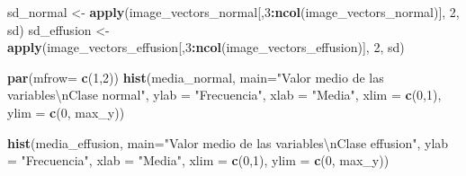 \documentclass[]{article}
\newenvironment{Shaded}{\begin{snugshade}}{\end{snugshade}}
\newcommand{\KeywordTok}[1]{\textcolor[rgb]{0.13,0.29,0.53}{\textbf{#1}}}
\newcommand{\DataTypeTok}[1]{\textcolor[rgb]{0.13,0.29,0.53}{#1}}
\newcommand{\DecValTok}[1]{\textcolor[rgb]{0.00,0.00,0.81}{#1}}
\newcommand{\CharTok}[1]{\textcolor[rgb]{0.31,0.60,0.02}{#1}}
\newcommand{\StringTok}[1]{\textcolor[rgb]{0.31,0.60,0.02}{#1}}
\newcommand{\OperatorTok}[1]{\textcolor[rgb]{0.81,0.36,0.00}{\textbf{#1}}}
\newcommand{\NormalTok}[1]{#1}
\begin{document}
\begin{Shaded}
\end{Shaded}

\begin{Shaded}
\begin{Highlighting}[]
\NormalTok{sd_normal <-}\StringTok{ }\KeywordTok{apply}\NormalTok{(image_vectors_normal[,}\DecValTok{3}\OperatorTok{:}\KeywordTok{ncol}\NormalTok{(image_vectors_normal)], }\DecValTok{2}\NormalTok{, sd)}
\NormalTok{sd_effusion <-}\StringTok{ }\KeywordTok{apply}\NormalTok{(image_vectors_effusion[,}\DecValTok{3}\OperatorTok{:}\KeywordTok{ncol}\NormalTok{(image_vectors_effusion)], }\DecValTok{2}\NormalTok{, sd)}
\end{Highlighting}
\end{Shaded}

\begin{Shaded}
\begin{Highlighting}[]
\KeywordTok{par}\NormalTok{(}\DataTypeTok{mfrow=} \KeywordTok{c}\NormalTok{(}\DecValTok{1}\NormalTok{,}\DecValTok{2}\NormalTok{))}
\KeywordTok{hist}\NormalTok{(media_normal,}
     \DataTypeTok{main=}\StringTok{"Valor medio de las variables}\CharTok{\textbackslash{}n}\StringTok{Clase normal"}\NormalTok{,}
     \DataTypeTok{ylab =} \StringTok{"Frecuencia"}\NormalTok{,}
     \DataTypeTok{xlab =} \StringTok{"Media"}\NormalTok{,}
     \DataTypeTok{xlim =} \KeywordTok{c}\NormalTok{(}\DecValTok{0}\NormalTok{,}\DecValTok{1}\NormalTok{),}
     \DataTypeTok{ylim =} \KeywordTok{c}\NormalTok{(}\DecValTok{0}\NormalTok{, max_y))}

\KeywordTok{hist}\NormalTok{(media_effusion,}
     \DataTypeTok{main=}\StringTok{"Valor medio de las variables}\CharTok{\textbackslash{}n}\StringTok{Clase effusion"}\NormalTok{,}
     \DataTypeTok{ylab =} \StringTok{"Frecuencia"}\NormalTok{,}
     \DataTypeTok{xlab =} \StringTok{"Media"}\NormalTok{,}
     \DataTypeTok{xlim =} \KeywordTok{c}\NormalTok{(}\DecValTok{0}\NormalTok{,}\DecValTok{1}\NormalTok{),}
     \DataTypeTok{ylim =} \KeywordTok{c}\NormalTok{(}\DecValTok{0}\NormalTok{, max_y))}
\end{Highlighting}
\end{Shaded}
\end{document}

